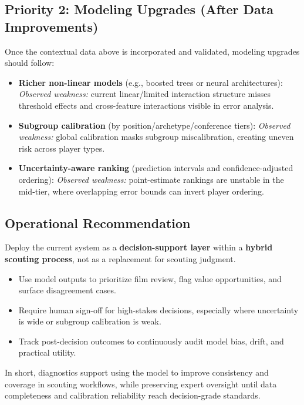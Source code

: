 \subsection{Priority 2: Modeling Upgrades (After Data Improvements)}
Once the contextual data above is incorporated and validated, modeling upgrades should follow:

\begin{itemize}
    \item \textbf{Richer non-linear models} (e.g., boosted trees or neural architectures):
    \emph{Observed weakness:} current linear/limited interaction structure misses threshold effects and cross-feature interactions visible in error analysis.

    \item \textbf{Subgroup calibration} (by position/archetype/conference tiers):
    \emph{Observed weakness:} global calibration masks subgroup miscalibration, creating uneven risk across player types.

    \item \textbf{Uncertainty-aware ranking} (prediction intervals and confidence-adjusted ordering):
    \emph{Observed weakness:} point-estimate rankings are unstable in the mid-tier, where overlapping error bounds can invert player ordering.
\end{itemize}

\subsection{Operational Recommendation}
Deploy the current system as a \textbf{decision-support layer} within a \textbf{hybrid scouting process}, not as a replacement for scouting judgment.

\begin{itemize}
    \item Use model outputs to prioritize film review, flag value opportunities, and surface disagreement cases.
    \item Require human sign-off for high-stakes decisions, especially where uncertainty is wide or subgroup calibration is weak.
    \item Track post-decision outcomes to continuously audit model bias, drift, and practical utility.
\end{itemize}

In short, diagnostics support using the model to improve consistency and coverage in scouting workflows, while preserving expert oversight until data completeness and calibration reliability reach decision-grade standards.
